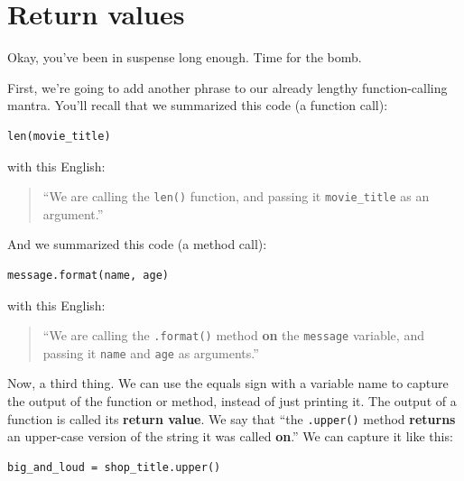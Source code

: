 \section{Return values}

\label{returnValues}
Okay, you've been in suspense long enough. Time for the bomb.

First, we're going to add another phrase to our already lengthy
function-calling mantra. You'll recall that we summarized this code (a function
call):

\begin{Verbatim}[fontsize=\small,samepage=true,frame=single,framesep=3mm]
len(movie_title)
\end{Verbatim}

with this English:

\begin{quote}
``We are calling the \texttt{len()} function, and passing it
\texttt{movie\_title} as an argument.''
\end{quote}

And we summarized this code (a method call):

\begin{Verbatim}[fontsize=\small,samepage=true,frame=single,framesep=3mm]
message.format(name, age)
\end{Verbatim}

with this English:

\begin{quote}
``We are calling the \texttt{.format()} method \textbf{on} the \texttt{message}
variable, and passing it \texttt{name} and \texttt{age} as arguments.''
\end{quote}

Now, a third thing. We can use the equals sign with a variable name to
capture the output of the function or method, instead of just printing it. The
output of a function is called its \textbf{return value}. We say that ``the
\texttt{.upper()} method \textbf{returns} an upper-case version of the string
it was called \textbf{on}.'' We can capture it like this:

\begin{Verbatim}[fontsize=\small,samepage=true,frame=single,framesep=3mm]
big_and_loud = shop_title.upper()
\end{Verbatim}

